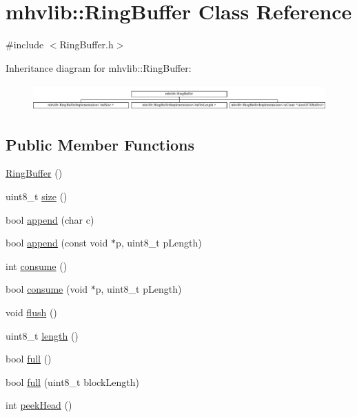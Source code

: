 \hypertarget{classmhvlib_1_1_ring_buffer}{\section{mhvlib\-:\-:Ring\-Buffer Class Reference}
\label{classmhvlib_1_1_ring_buffer}
}


{\ttfamily \#include $<$Ring\-Buffer.\-h$>$}

Inheritance diagram for mhvlib\-:\-:Ring\-Buffer\-:\begin{figure}[H]
\begin{center}
\leavevmode
\includegraphics[height=1.011743cm]{classmhvlib_1_1_ring_buffer}
\end{center}
\end{figure}
\subsection*{Public Member Functions}
\begin{DoxyCompactItemize}
\item 
\hyperlink{classmhvlib_1_1_ring_buffer_af80e701a1e58603526c66cced2599789}{Ring\-Buffer} ()
\item 
uint8\-\_\-t \hyperlink{classmhvlib_1_1_ring_buffer_a8f86b277311ee896e078173c570ae410}{size} ()
\item 
bool \hyperlink{classmhvlib_1_1_ring_buffer_a81a544067a97c25f85dcc26423d5f84d}{append} (char c)
\item 
bool \hyperlink{classmhvlib_1_1_ring_buffer_acdfa3290112c62d3f917f83d78807806}{append} (const void $\ast$p, uint8\-\_\-t p\-Length)
\item 
int \hyperlink{classmhvlib_1_1_ring_buffer_a0ccf83c4a96782df0c4f9456680ea02a}{consume} ()
\item 
bool \hyperlink{classmhvlib_1_1_ring_buffer_ae5497a6c7b26838d3c2056563856f29a}{consume} (void $\ast$p, uint8\-\_\-t p\-Length)
\item 
void \hyperlink{classmhvlib_1_1_ring_buffer_a5695c76d4067b6379075cf9f6f4e16bc}{flush} ()
\item 
uint8\-\_\-t \hyperlink{classmhvlib_1_1_ring_buffer_a5571540ab3ad994c32a454d893f5194d}{length} ()
\item 
bool \hyperlink{classmhvlib_1_1_ring_buffer_aa55ecc01bcdf1d18c59e03ec272acc3d}{full} ()
\item 
bool \hyperlink{classmhvlib_1_1_ring_buffer_a406c248b39fd660b388aa9093935eea9}{full} (uint8\-\_\-t block\-Length)
\item 
int \hyperlink{classmhvlib_1_1_ring_buffer_a2d715c9364e19ab1e8d4ac52d17651fa}{peek\-Head} ()
\end{DoxyCompactItemize}
